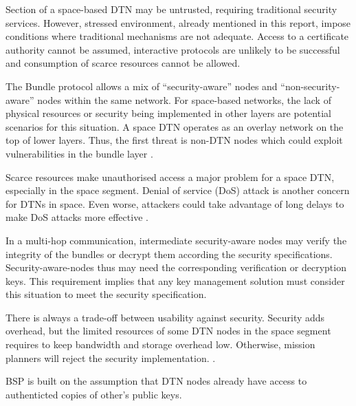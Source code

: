  
 Section of a space-based DTN may be untrusted, requiring traditional security services. However, stressed environment, already mentioned in this report, impose conditions where traditional mechanisms are not adequate. Access to a certificate authority cannot be assumed, interactive protocols are unlikely to be successful and consumption of scarce resources cannot be allowed.
 
 
 The Bundle protocol allows a mix of ``security-aware'' nodes and ``non-security-aware'' nodes within the same network. For space-based networks, the lack of physical resources or security being implemented in other layers are potential scenarios for this situation. A space DTN operates as an overlay network on the top of lower layers. Thus, the first threat is non-DTN nodes which could exploit vulnerabilities in the bundle layer \cite{rfc6257}.
 
Scarce resources make unauthorised access a major problem for a space DTN, especially in the space segment. Denial of service (DoS) attack is another concern for DTNs in space. Even worse, attackers could take advantage of long delays to make DoS attacks more effective \cite{rfc6257}. 

 
In a multi-hop communication, intermediate security-aware nodes may verify the integrity of the bundles or decrypt them according the security specifications. Security-aware-nodes thus may need the corresponding verification or decryption keys. This requirement implies that any key management solution must consider this situation to meet the security specification.

There is always a trade-off between usability against security. Security adds overhead, but the limited resources of some DTN nodes in the space segment requires to keep bandwidth and storage overhead low. Otherwise, mission planners will reject the security implementation. \cite{book2012architecture}.





BSP is built on the assumption that DTN nodes already have access to authenticted copies of other's public keys.







